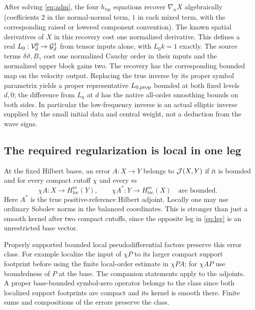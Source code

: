 After solving \eqref{eq:adm}, the four \(h_{n\mu}\) equations recover \(\nabla_n X\) algebraically (coefficients \(2\) in the normal-normal term, \(1\) in each mixed term, with the corresponding raised or lowered component convention). The known spatial derivatives of \(X\) in this recovery cost one normalized derivative. This defines a real \(L_0:\mathcal V_d^0\to\mathcal G_d^1\) from tensor inputs alone, with \(L_0k=1\) exactly. The source terms \(\delta\vartheta,B_\gamma\) cost one normalized Cauchy order in their inputs and the normalized upper block gains two. The recovery has the corresponding bounded map on the velocity output. Replacing the true inverse by its proper symbol parametrix yields a proper representative \(L_{0,\rm prop}\) bounded at both fixed levels \(d,0\); the difference from \(L_0\) at \(d\) has the native all-order smoothing bounds on both sides. In particular the low-frequency inverse is an actual elliptic inverse supplied by the small initial data and central weight, not a deduction from the wave signs.

\subsection{The required regularization is local in one leg}\label{sec:leg}

At the fixed Hilbert bases, an error \(A:X\to Y\) belongs to \(\mathcal J(X,Y)\) if it is bounded and for every compact cutoff \(\chi\) and every \(m\)
\begin{equation}
 \chi A:X\longrightarrow H_{\mathrm{loc}}^m(Y),
 \qquad
 \chi A^*:Y\longrightarrow H_{\mathrm{loc}}^m(X)
 \quad\text{are bounded}.
 \label{eq:leg}
\end{equation}
Here \(A^*\) is the true positive-reference Hilbert adjoint. Locally one may use ordinary Sobolev norms in the balanced coordinates. This is stronger than just a smooth kernel after two compact cutoffs, since the opposite leg in \eqref{eq:leg} is an unrestricted base vector.

Properly supported bounded local pseudodifferential factors preserve this error class. For example localize the input of \(\chi P\) to its larger compact support footprint before using the finite local-order estimate in \(\chi PA\); for \(\chi AP\) use boundedness of \(P\) at the base. The companion statements apply to the adjoints. A proper base-bounded symbol-zero operator belongs to the class since both localized support footprints are compact and its kernel is smooth there. Finite sums and compositions of the errors preserve the class.

